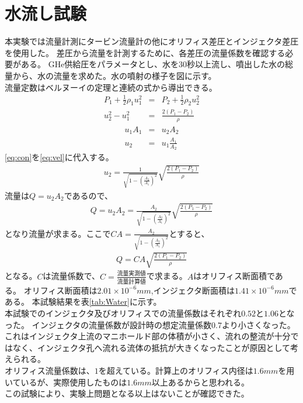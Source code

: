 \section{水流し試験}
本実験では流量計測にタービン流量計の他にオリフィス差圧とインジェクタ差圧を使用した。
差圧から流量を計測するために、各差圧の流量係数を確認する必要がある。
GHe供給圧をパラメータとし、水を30秒以上流し、噴出した水の総量から、水の流量を求めた。水の噴射の様子を図に示す。
\\
流量定数はベルヌーイの定理と連続の式から導出できる。
\begin{eqnarray}
P_{1} + \frac{1}{2} \rho_{1} u^2_{1} &=& P_{2} + \frac{1}{2} \rho_{2} u^2_{2}  \nonumber \\
u^2_{2} - u^2_{1} &=& \frac{2(P_{1}-P_{2})}{\rho} 
\label{eq:vel}
\end{eqnarray}
\begin{eqnarray}
u_{1}A_{1} &=& u_{2}A_{2}  \nonumber \\
u_{2} &=& u_{1}\frac{A_{1}}{A_{2}}
\label{eq:con}
\end{eqnarray}
\ref{eq:con}を\ref{eq:vel}に代入する。
\begin{eqnarray}
u_{2}=\frac{1}{\sqrt{1-(\frac{A_{2}}{A_{1}})^2}}\sqrt{\frac{2(P_{1}-P_{2})}{\rho}}
\label{eq:Velocity}
\end{eqnarray}
流量は$Q=u_{2}A_{2}$であるので、
\begin{eqnarray}
Q=u_{2}A_{2}=\frac{A_{2}}{\sqrt{1-(\frac{A_{2}}{A_{1}})^2}}\sqrt{\frac{2(P_{1}-P_{2})}{\rho}}
\label{eq:VFlux}
\end{eqnarray}
となり流量が求まる。ここで$CA=\frac{A_{2}}{\sqrt{1-(\frac{A_{2}}{A_{1}})^2}}$とすると、
\begin{eqnarray}
Q=CA\sqrt{\frac{2(P_{1}-P_{2})}{\rho}}
\label{eq:IdealFlux}
\end{eqnarray}
となる。$C$は流量係数で、$C=\frac{流量実測値}{流量計算値}$で求まる。$A$はオリフィス断面積である。
オリフィス断面積は$2.01 \times 10^{-6}mm$,インジェクタ断面積は$1.41 \times 10^{-6}mm$である。
本試験結果を表\ref{tab:Water}に示す。
\\
本試験でのインジェクタ及びオリフィスでの流量係数はそれぞれ$0.52$と$1.06$となった。
インジェクタの流量係数が設計時の想定流量係数$0.7$より小さくなった。
これはインジェクタ上流のマニホールド部の体積が小さく、流れの整流が十分ではなく、インジェクタ孔へ流れる流体の抵抗が大きくなったことが原因として考えられる。
\\
オリフィス流量係数は、$1$を超えている。計算上のオリフィス内径は$1.6mm$を用いているが、実際使用したものは$1.6mm$以上あるからと思われる。
\\
この試験により、実験上問題となる以上はないことが確認できた。
